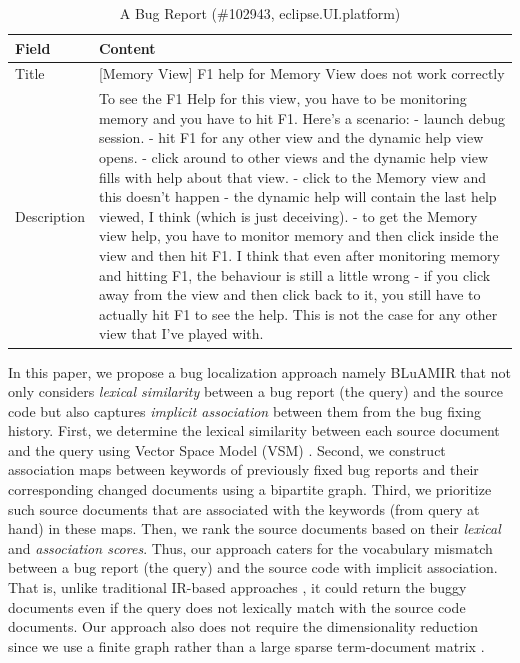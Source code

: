 \documentclass[conference]{IEEEtran}
\begin{document}
\begin{table}[!tb]
	\caption{A Bug Report (\#102943, eclipse.UI.platform)}
	\label{tab:BugInfo}
	\vspace{-.4cm}
	\begin{center}
		\begin{tabular}{ p{1.5cm} | p{6cm}}
			\hline
			\textbf{Field}  & \textbf{Content} \\
			\hline
			\hline
			Title & [Memory View] F1 help for Memory View does not work correctly
			\\
			\hline
			Description &  
		To see the F1 Help for this view, you have to be monitoring memory and you have
		to hit F1. Here's a scenario:
		- launch debug session.
		- hit F1 for any other view and the dynamic help view opens.
		- click around to other views and the dynamic help view fills with help about
		that view.
		- click to the Memory view and this doesn't happen - the dynamic help will
		contain the last help viewed, I think (which is just deceiving).
		- to get the Memory view help, you have to monitor memory and then click inside
		the view and then hit F1.
		I think that even after monitoring memory and hitting F1, the behaviour is still
		a little wrong - if you click away from the view and then click back to it, you
		still have to actually hit F1 to see the help. This is not the case for any
		other view that I've played with.\\
			\hline
		\end{tabular}
	\end{center}
\end{table}


In this paper, we propose a bug localization approach namely BLuAMIR that not only considers \emph{lexical similarity} between a bug report (the query) and the source code but also captures \emph{implicit association} between them from the bug fixing history. First, we determine the lexical similarity between each source document and the query using Vector Space Model (VSM) \cite{Jian}.
Second, we construct association maps between keywords of previously fixed bug reports and their corresponding changed documents using a bipartite graph. Third, we prioritize such source documents that are associated with the keywords (from query at hand) in these maps. Then, we rank the source documents based on their \emph{lexical} and \emph{association scores}.
Thus, our approach caters for the vocabulary mismatch between a bug report (the query) and the source code with implicit association. 
That is, unlike traditional IR-based approaches \cite{Jian,Saha}, it could return the buggy documents even if the query does not lexically match with the source code documents. Our approach also does not require the dimensionality reduction since we use a finite graph rather than a large sparse term-document matrix \cite{MarcusLSI,MarcusMaletic}.
\end{document}
